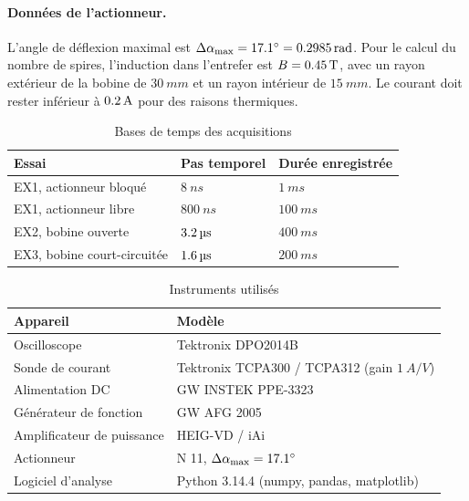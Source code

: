 \paragraph{Données de l'actionneur.}
L'angle de déflexion maximal est \(\Delta\alpha_{\max} = \SI{17{,}1}{\degree} = \SI{0{,}2985}{rad}\). Pour le calcul du nombre de spires, l'induction dans l'entrefer est \(B = \SI{0{,}45}{T}\), avec un rayon extérieur de la bobine de \(\SI{30}{mm}\) et un rayon intérieur de \(\SI{15}{mm}\). Le courant doit rester inférieur à \(\SI{0{,}2}{A}\) pour des raisons thermiques.

\begin{table}[H]
\centering
\caption{Bases de temps des acquisitions}
\begin{tabular}{lll}
\toprule
Essai & Pas temporel & Durée enregistrée \\
\midrule
EX1, actionneur bloqué & \(\SI{8}{ns}\) & \(\SI{1}{ms}\) \\
EX1, actionneur libre & \(\SI{800}{ns}\) & \(\SI{100}{ms}\) \\
EX2, bobine ouverte & \(\SI{3{,}2}{\micro s}\) & \(\SI{400}{ms}\) \\
EX3, bobine court-circuitée & \(\SI{1{,}6}{\micro s}\) & \(\SI{200}{ms}\) \\
\bottomrule
\end{tabular}
\label{tab:conditions_time}
\end{table}

\begin{table}[H]
\centering
\caption{Instruments utilisés}
\begin{tabular}{ll}
\toprule
Appareil & Modèle \\
\midrule
Oscilloscope        & Tektronix DPO2014B \\
Sonde de courant    & Tektronix TCPA300 / TCPA312 (gain \(\SI{1}{A/V}\)) \\
Alimentation DC     & GW INSTEK PPE-3323 \\
Générateur de fonction & GW AFG 2005 \\
Amplificateur de puissance & HEIG-VD / iAi \\
Actionneur          & N 11, \(\Delta\alpha_{\max} = \SI{17{,}1}{\degree}\) \\
Logiciel d'analyse  & Python 3.14.4 (numpy, pandas, matplotlib) \\
\bottomrule
\end{tabular}
\label{tab:appareils}
\end{table}
